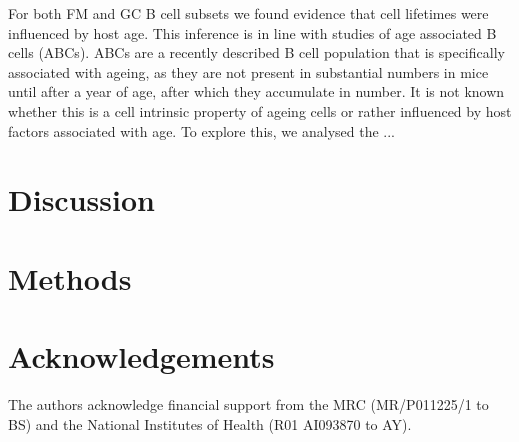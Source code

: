\documentclass[12pt]{article}
\begin{document}
For both FM and GC B cell subsets we found evidence that cell lifetimes were influenced by host age. This inference is in line with studies of age associated B cells (ABCs).  ABCs are a  recently described B cell population that is specifically associated with ageing, as they are not present in substantial numbers in mice until after a year of age, after which they accumulate in number. It is not known whether this is a cell intrinsic property of ageing cells or rather influenced by host factors associated with age. To explore this, we analysed the ...




\section*{Discussion}


\section*{Methods}


\section*{Acknowledgements}
The authors acknowledge financial support from the MRC (MR/P011225/1 to BS) and the National Institutes of Health (R01 AI093870 to AY). 



\nolinenumbers %
 

{\small 

}


\clearpage
\end{document}
